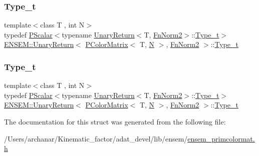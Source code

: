 \subsubsection{\texorpdfstring{Type\_t}{Type\_t}\hspace{0.1cm}{\footnotesize\ttfamily [1/2]}}
{\footnotesize\ttfamily template$<$class T , int N$>$ \\
typedef \mbox{\hyperlink{classENSEM_1_1PScalar}{P\+Scalar}}$<$typename \mbox{\hyperlink{structENSEM_1_1UnaryReturn}{Unary\+Return}}$<$T, \mbox{\hyperlink{structENSEM_1_1FnNorm2}{Fn\+Norm2}}$>$\+::\mbox{\hyperlink{structENSEM_1_1UnaryReturn_3_01PColorMatrix_3_01T_00_01N_01_4_00_01FnNorm2_01_4_ae6f0888acac23f20273fc635923e42cc}{Type\+\_\+t}}$>$ \mbox{\hyperlink{structENSEM_1_1UnaryReturn}{E\+N\+S\+E\+M\+::\+Unary\+Return}}$<$ \mbox{\hyperlink{classENSEM_1_1PColorMatrix}{P\+Color\+Matrix}}$<$ T, \mbox{\hyperlink{operator__name__util_8cc_a7722c8ecbb62d99aee7ce68b1752f337}{N}} $>$, \mbox{\hyperlink{structENSEM_1_1FnNorm2}{Fn\+Norm2}} $>$\+::\mbox{\hyperlink{structENSEM_1_1UnaryReturn_3_01PColorMatrix_3_01T_00_01N_01_4_00_01FnNorm2_01_4_ae6f0888acac23f20273fc635923e42cc}{Type\+\_\+t}}}

\mbox{\label{structENSEM_1_1UnaryReturn_3_01PColorMatrix_3_01T_00_01N_01_4_00_01FnNorm2_01_4_ae6f0888acac23f20273fc635923e42cc}} 
\subsubsection{\texorpdfstring{Type\_t}{Type\_t}\hspace{0.1cm}{\footnotesize\ttfamily [2/2]}}
{\footnotesize\ttfamily template$<$class T , int N$>$ \\
typedef \mbox{\hyperlink{classENSEM_1_1PScalar}{P\+Scalar}}$<$typename \mbox{\hyperlink{structENSEM_1_1UnaryReturn}{Unary\+Return}}$<$T, \mbox{\hyperlink{structENSEM_1_1FnNorm2}{Fn\+Norm2}}$>$\+::\mbox{\hyperlink{structENSEM_1_1UnaryReturn_3_01PColorMatrix_3_01T_00_01N_01_4_00_01FnNorm2_01_4_ae6f0888acac23f20273fc635923e42cc}{Type\+\_\+t}}$>$ \mbox{\hyperlink{structENSEM_1_1UnaryReturn}{E\+N\+S\+E\+M\+::\+Unary\+Return}}$<$ \mbox{\hyperlink{classENSEM_1_1PColorMatrix}{P\+Color\+Matrix}}$<$ T, \mbox{\hyperlink{operator__name__util_8cc_a7722c8ecbb62d99aee7ce68b1752f337}{N}} $>$, \mbox{\hyperlink{structENSEM_1_1FnNorm2}{Fn\+Norm2}} $>$\+::\mbox{\hyperlink{structENSEM_1_1UnaryReturn_3_01PColorMatrix_3_01T_00_01N_01_4_00_01FnNorm2_01_4_ae6f0888acac23f20273fc635923e42cc}{Type\+\_\+t}}}



The documentation for this struct was generated from the following file\+:\begin{DoxyCompactItemize}
\item 
/\+Users/archanar/\+Kinematic\+\_\+factor/adat\+\_\+devel/lib/ensem/\mbox{\hyperlink{lib_2ensem_2ensem__primcolormat_8h}{ensem\+\_\+primcolormat.\+h}}\end{DoxyCompactItemize}
